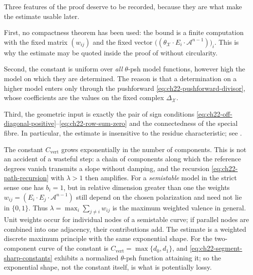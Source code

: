 \begin{remark}
\label{rem:ch22-vertex-estimate-nature}
Three features of the proof deserve to be recorded, because they are what
make the estimate usable later.

First, no compactness theorem has been used: the bound is a finite
computation with the fixed matrix \((w_{ij})\) and the fixed vector
\(\bigl((\theta_{\mathcal X}\cdot E_i\cdot\mathcal A^{n-1})\bigr)_i\).  This
is why the estimate may be quoted inside the proof of
 without circularity.

Second, the constant is uniform over \emph{all} \(\theta\)-psh model
functions, however high the model on which they are determined.  The reason
is that a determination on a higher model enters only through the
pushforward \eqref{eq:ch22-pushforward-divisor}, whose coefficients are the
values on the fixed complex \(\Delta_{\mathcal X}\).

Third, the geometric input is exactly the pair of sign conditions
\eqref{eq:ch22-off-diagonal-positive}--\eqref{eq:ch22-row-sum-zero} and the
connectedness of the special fibre.  In particular, the estimate is
insensitive to the residue characteristic; see
.
\end{remark}

\begin{remark}
\label{rem:ch22-exponential-constant}
The constant \(C_{\mathrm{vert}}\) grows exponentially in the number of
components.  This is not an accident of a wasteful step: a chain of
components along which the reference degrees vanish transmits a slope
without damping, and the recursion \eqref{eq:ch22-path-recursion} with
\(\lambda>1\) then amplifies.  For a \emph{semistable} model in the strict
sense one has \(b_i=1\), but in relative dimension greater than one the
weights
\(w_{ij}=(E_i\cdot E_j\cdot\mathcal A^{n-1})\) still depend on the chosen
polarization and need not lie in \(\{0,1\}\).  Thus
\(\lambda=\max_i\sum_{j\ne i}w_{ij}\) is the maximum weighted valence in
general.  Unit weights occur for individual nodes of a semistable curve; if
parallel nodes are combined into one adjacency, their contributions add.
The estimate is a weighted discrete maximum principle with the same
exponential shape.  For the two-component curve of
 the constant is \(C_{\mathrm{vert}}=
\max\{d_0,d_1\}\), and \eqref{eq:ch22-segment-sharp-constants} exhibits a
normalized \(\theta\)-psh function attaining it; so the exponential shape,
not the constant itself, is what is potentially lossy.
\end{remark}

